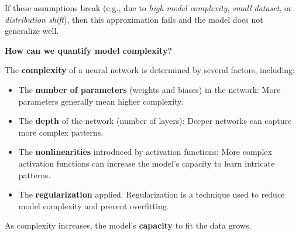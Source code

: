 \highspace
\textcolor{Red2}{} If these assumptions break (e.g., due to \emph{high model complexity}, \emph{small dataset}, or \emph{distribution shift}), then this approximation fails and the model does not generalize well.

\highspace
\begin{flushleft}
    \textcolor{Green3}{ \textbf{How can we quantify model complexity?}}
\end{flushleft}
The \textbf{complexity} of a neural network is determined by several factors, including:
\begin{itemize}
    \item The \textbf{number of parameters} (weights and biases) in the network: More parameters generally mean higher complexity.
    \item The \textbf{depth} of the network (number of layers): Deeper networks can capture more complex patterns.
    \item The \textbf{nonlinearities} introduced by activation functions: More complex activation functions can increase the model's capacity to learn intricate patterns.
    \item The \textbf{regularization} applied. Regularization is a technique used to reduce model complexity and prevent overfitting.
\end{itemize}
As complexity increases, the model's \textbf{capacity} to fit the data grows.


